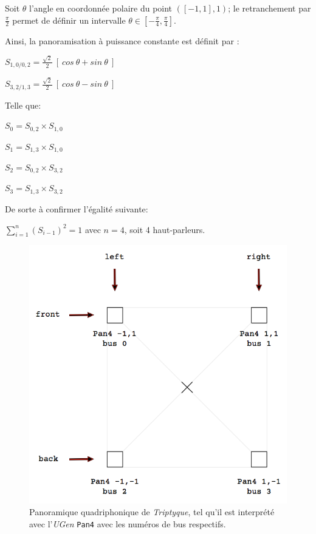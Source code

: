 \bigskip

Soit $\theta$ l'angle en coordonn\'ee polaire du point $([-1,1],1)$; le retranchement par $\frac{\pi}{2}$ permet de d\'efinir un intervalle  $\theta \in [ - \frac{\pi}{4}, \frac{\pi}{4}]$.

\smallskip

\noindent Ainsi, la panoramisation \`a puissance constante est d\'efinit par \citep[ p. 134]{cr}:
\smallskip

$S_{1,0/0,2} = \frac{\sqrt{2}}{2} \: [ \: cos \: \theta + sin \: \theta \: ]$

$S_{3,2/1,3} = \frac{\sqrt{2}}{2} \: [ \: cos \: \theta - sin \: \theta \: ]$

\smallskip

\noindent Telle que:

$S_0=S_{0,2} \times S_{1,0}$

$S_1=S_{1,3} \times S_{1,0}$

$S_2=S_{0,2} \times S_{3,2}$

$S_3=S_{1,3} \times S_{3,2}$

\smallskip

\noindent De sorte \`a confirmer l'\'egalité suivante:

\smallskip

$\displaystyle \sum_{i=1}^{n} (S_{i-1})^2 =1$ avec $n=4$, soit 4 haut-parleurs. 

 \begin{figure}[H]
\begin{center}
\includegraphics[scale=0.5]{img/6643}
\caption{Panoramique quadriphonique de \textit{Triptyque}, tel qu'il est interpr\'et\'e avec l'\textit{UGen} \texttt{Pan4} avec les num\'eros de bus respectifs. }
\label{pan}
\end{center}
\end{figure}


